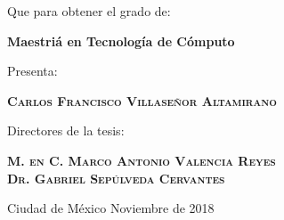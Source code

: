 \begin{titlepage}
	\vspace{1.5cm}
	{ \large Que para obtener el grado de:\par}
	{ \large \bfseries Maestriá en Tecnología de Cómputo\par}
	\vspace{2cm}
	{ \large  Presenta:\par}
	{ \large \bfseries \textsc{ Carlos Francisco Villaseñor Altamirano}\par}
	\vspace{2cm}
	{\large Directores de la tesis:\par}
	{\large \bfseries \textsc{M. en C. Marco Antonio Valencia Reyes}}\\
	{\large \bfseries \textsc{Dr. Gabriel Sepúlveda Cervantes}}
	\vfill

	{Ciudad de México \hfill Noviembre de 2018\par}
\end{titlepage}







%